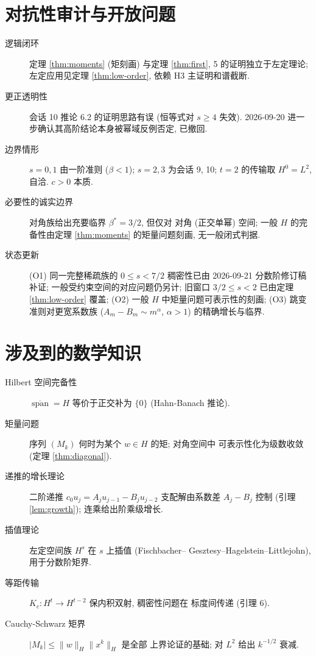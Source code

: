 \documentclass[UTF8]{ctexart}
\begin{document}
\section{对抗性审计与开放问题}

\begin{description}
	\item[逻辑闭环] 定理 \ref{thm:moments} (矩刻画) 与定理 \ref{thm:first}, 5 的证明独立于左定理论;
		左定应用见定理 \ref{thm:low-order}, 依赖 H3 主证明和谱截断.
	\item[更正透明性] 会话 10 推论 6.2 的证明思路有误 (恒等式对 $s \geq 4$
		失效). 2026-09-20 进一步确认其高阶结论本身被幂域反例否定, 已撤回.
	\item[边界情形] $s = 0, 1$ 由一阶准则 ($\beta < 1$); $s = 2, 3$
		为会话 9, 10; $t = 2$ 的传输取 $H^0 = L^2$, 自洽. $c > 0$ 本质.
	\item[必要性的诚实边界] 对角族给出充要临界 $\beta^* = 3/2$, 但仅对
		对角 (正交单幂) 空间; 一般 $H$ 的完备性由定理 \ref{thm:moments} 的矩量问题刻画,
		无一般闭式判据.
	\item[状态更新] (O1) 同一完整稀疏族的 $0\le s<7/2$ 稠密性已由 2026-09-21 分数阶修订稿补证; 一般受约束空间的对应问题仍另计;
		旧窗口 $3/2\le s<2$ 已由定理 \ref{thm:low-order} 覆盖;
		(O2) 一般 $H$ 中矩量问题可表示性的刻画;
		(O3) 跳变准则对更宽系数族 ($A_m - B_m \sim m^\alpha$, $\alpha > 1$)
		的精确增长与临界.
\end{description}

\section{涉及到的数学知识}

\begin{description}
	\item[Hilbert 空间完备性] $\overline{\operatorname{span}} = H$
		等价于正交补为 $\{0\}$ (Hahn-Banach 推论).
	\item[矩量问题] 序列 $(M_k)$ 何时为某个 $w \in H$ 的矩; 对角空间中
		可表示性化为级数收敛 (定理 \ref{thm:diagonal}).
	\item[递推的增长理论] 二阶递推 $c_0 u_j = A_ju_{j-1} - B_ju_{j-2}$
		支配解由系数差 $A_j - B_j$ 控制 (引理 \ref{lem:growth}); 连乘给出阶乘级增长.
	\item[插值理论] 左定空间族 $H^s$ 在 $s$ 上插值 (Fischbacher--
		Gesztesy--Hagelstein--Littlejohn), 用于分数阶矩界.
	\item[等距传输] $K_c: H^t \to H^{t-2}$ 保内积双射, 稠密性问题在
		标度间传递 (引理 6).
	\item[Cauchy-Schwarz 矩界] $|M_k| \leq \|w\|_H \|x^k\|_H$ 是全部
		上界论证的基础; 对 $L^2$ 给出 $k^{-1/2}$ 衰减.
\end{description}
\end{document}
